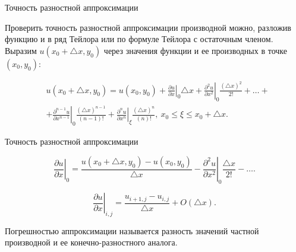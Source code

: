 \documentclass[10pt,xcolor=pst,aspectratio=169]{beamer}
\begin{document}
\begin{frame}{Точность разностной аппроксимации}

    \transdissolve[duration=0.1]
    \justifying
    \large

    Проверить точность разностной аппроксимации производной можно, разложив функцию и в ряд Тейлора или по формуле Тейлора с остаточным членом. Выразим $u \left( x_{0} + \triangle x, y_{0} \right)$ через значения функции и ее производных в точке $\left( x_{0}, y_{0} \right)$:

    \[
        \begin{split}
            &u \left( x_{0} + \triangle x, y_{0} \right) = u \left( x_{0}, y_{0} \right) + \boxed{\left. \frac{\partial u}{\partial x} \right|_{0} \triangle x} + \left. \frac{\partial^{2} u}{\partial x^{2}} \right|_{0} \frac{\left( \triangle x \right)^{2}}{2!} + \ldots + \\
            &+ \left. \frac{\partial^{n-1} u}{\partial x^{n-1}} \right|_{0} \frac{\left( \triangle x \right)^{n-1}}{\left( n - 1 \right)!} + \left. \frac{\partial^{n} u}{ \partial x^{n}} \right|_{\xi} \frac{\left( \triangle x \right)^{n}}{\left( n \right)!}, \: x_{0} \leq \xi \leq x_{0} + \triangle x.
        \end{split}
    \]

\end{frame}

\begin{frame}{Точность разностной аппроксимации}

    \transdissolve[duration=0.1]
    \justifying
    \large

    \[
        \left. \frac{\partial u}{\partial x} \right|_{0} = \frac{u \left( x_{0} + \triangle x, y_{0} \right) - u \left( x_{0}, y_{0} \right)}{\triangle x} - \left. \frac{\partial^{2} u}{\partial x^{2}} \right|_{0} \frac{\triangle x}{2!} - \ldots.
    \]

    \[
        \left. \frac{\partial u}{\partial x} \right|_{i, j} = \frac{u_{i + 1, j} - u_{i, j}}{\triangle x} + \mathit{O} \left( \triangle x \right).
    \]

    Погрешностью аппроксимации называется разность значений частной производной и ее конечно-разностного аналога.

\end{frame}
\end{document}
